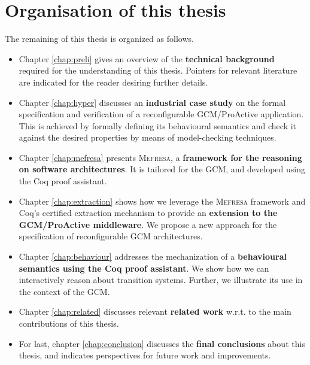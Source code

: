 \section{Organisation of this thesis}
\label{sec:struct}

	The remaining of this thesis is organized as follows.


	\begin{itemize}
		\item Chapter \ref{chap:preli} gives an overview of the \textbf{technical background} required for the understanding 
			      of this thesis. Pointers for relevant literature are indicated for the reader desiring further
				  details.				
				
				  
		\item Chapter \ref{chap:hyper} discusses an \textbf{industrial case study} on the formal specification and verification
			     of a reconfigurable GCM/ProActive application. This is achieved by formally defining its behavioural
				 semantics and check it against the desired properties by means of model-checking techniques. 
			     		
		
		\item Chapter \ref{chap:mefresa} presents \textsc{Mefresa}, a \textbf{framework for the reasoning on software architectures}.
				  It is tailored for the \ac{GCM}, and developed using the Coq proof assistant. 
				  
				  
		\item Chapter \ref{chap:extraction} shows how we leverage the \textsc{Mefresa} framework and Coq's certified extraction 
		         mechanism	to provide an \textbf{extension to the GCM/ProActive middleware}. We propose a 
		         new approach for the specification of reconfigurable \ac{GCM} architectures.		
		
		\item Chapter \ref{chap:behaviour} addresses the mechanization of a \textbf{behavioural semantics using the Coq proof assistant}. We show how we can interactively reason about transition
		systems.
			     Further, we illustrate its use in the context of the \ac{GCM}.
		
		
		\item Chapter \ref{chap:related} discusses relevant \textbf{related work} w.r.t. to the main contributions of this thesis.			
				  	
					

		\item For last, chapter \ref{chap:conclusion} discusses the \textbf{final conclusions} about this thesis, and 
		         indicates perspectives for future work and improvements.
		
		
	\end{itemize}



